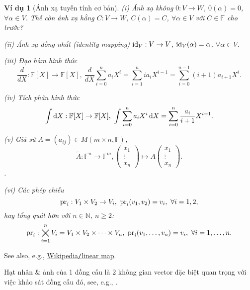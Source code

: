 \documentclass{article}
\newtheorem{vidu}{Ví dụ}
\begin{document}
\begin{vidu}[Ánh xạ tuyến tính cơ bản]
	\item(i) Ánh xạ không $0:V\to W$, $0(\alpha) = 0$, $\forall\alpha\in V$. Thế còn ánh xạ hằng $C:V\to W$, $C(\alpha) = C$, $\forall\alpha\in V$ với $C\in\mathbb{F}$ cho trước?
	\item(ii) Ánh xạ đồng nhất (identity mapping) ${\rm id}_V:V\to V$, ${\rm id}_V(\alpha) = \alpha$, $\forall\alpha\in V$.
	\item(iii) Đạo hàm hình thức
	\begin{equation}
		\frac{d}{dX}:\mathbb{F}[X]\to\mathbb{F}[X],\ \frac{d}{dX}\sum_{i=0}^n a_iX^i = \sum_{i=1}^n ia_iX^{i-1} = \sum_{i=0}^{n-1} (i + 1)a_{i + 1}X^i.
	\end{equation}
	\item(iv) Tích phân hình thức
	\begin{equation}
		\int {\rm d}X:\mathbb{F}[X]\to\mathbb{F}[X],\ \int \sum_{i=0}^n a_iX^i\,{\rm d}X = \sum_{i=0}^n \frac{a_i}{i + 1}X^{i+1}.
	\end{equation}
	\item(v) Giả sử $A = (a_{ij})\in M(m\times n,\mathbb{F})$,
	\begin{equation}
		\widetilde{A}:\mathbb{F}^n\to\mathbb{F}^m,\begin{pmatrix}
			x_1\\\vdots\\x_n
		\end{pmatrix}\mapsto A\begin{pmatrix}
		x_1\\\vdots\\x_n
		\end{pmatrix}.
	\end{equation}.
	\item(vi) Các phép chiếu
	\begin{equation}
		{\rm pr}_i:V_1\times V_2\to V_i,\ {\rm pr}_i(v_1,v_2) = v_i,\ \forall i = 1,2,
	\end{equation}
	hay tổng quát hơn với $n\in\mathbb{N}$, $n\ge2$:
	\begin{equation}
		{\rm pr}_i:\bigtimes_{i=1}^n V_i = V_1\times V_2\times\cdots\times V_n,\ {\rm pr}_i(v_1,\ldots,v_n) = v_i,\ \forall i = 1,\ldots,n.
	\end{equation}
\end{vidu}
See also, e.g., \href{https://en.wikipedia.org/wiki/Linear_map}{Wikipedia{\tt/}linear map}.

Hạt nhân \& ảnh của 1 đồng cấu là 2 không gian vector đặc biệt quan trọng với việc khảo sát đồng cấu đó, see, e.g., \cite[Chap. 2, \S3: Hạt nhân \& ảnh của đồng cấu, pp. 110--116]{Hung_linear_algebra}.
\end{document}
